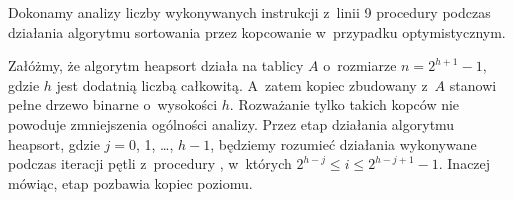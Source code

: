 \exercise %
Dokonamy analizy liczby wykonywanych instrukcji z~linii 9 procedury  podczas działania algorytmu sortowania przez kopcowanie w~przypadku optymistycznym.

Załóżmy, że algorytm heapsort działa na tablicy $A$ o~rozmiarze $n=2^{h+1}-1$, gdzie $h$ jest dodatnią liczbą całkowitą.
A~zatem kopiec zbudowany z~$A$ stanowi pełne drzewo binarne o~wysokości $h$.
Rozważanie tylko takich kopców nie powoduje zmniejszenia ogólności analizy.
Przez  etap działania algorytmu heapsort, gdzie $j=0$, 1, \dots, $h-1$, będziemy rozumieć działania wykonywane podczas iteracji pętli  z~procedury , w~których $2^{h-j}\le i\le2^{h-j+1}-1$.
Inaczej mówiąc,  etap pozbawia kopiec  poziomu.

